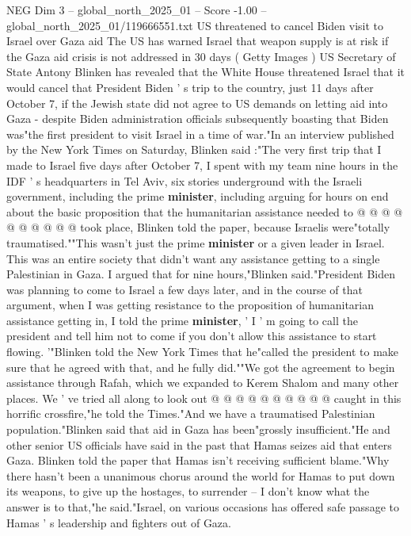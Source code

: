 \begin{textsample}{NEG Dim 3 – global\_north\_2025\_01 – Score -1.00 – global\_north\_2025\_01/119666551.txt}  \label{ex:f3_neg_192}
US threatened to cancel Biden visit to Israel over Gaza aid The US has warned Israel that weapon supply is at risk if the Gaza aid crisis is not addressed in 30 days ( Getty Images ) US Secretary of State Antony Blinken has revealed that the White House threatened Israel that it would cancel that President Biden ' s trip to the country, just 11 days after October 7, if the Jewish state did not agree to US demands on letting aid into Gaza - despite Biden administration officials subsequently boasting that Biden was"the first president to visit Israel in a time of war."In an interview published by the New York Times on Saturday, Blinken said :"The very first trip that I made to Israel five days after October 7, I spent with my team nine hours in the IDF ' s headquarters in Tel Aviv, six stories underground with the Israeli government, including the prime \textbf{minister}, including arguing for hours on end about the basic proposition that the humanitarian assistance needed to @ @ @ @ @ @ @ @ @ @ took place, Blinken told the paper, because Israelis were"totally traumatised.""This wasn't just the prime \textbf{minister} or a given leader in Israel.
This was an entire society that didn't want any assistance getting to a single Palestinian in Gaza.
I argued that for nine hours,"Blinken said."President Biden was planning to come to Israel a few days later, and in the course of that argument, when I was getting resistance to the proposition of humanitarian assistance getting in, I told the prime \textbf{minister}, ' I ' m going to call the president and tell him not to come if you don't allow this assistance to start flowing. '"Blinken told the New York Times that he"called the president to make sure that he agreed with that, and he fully did.""We got the agreement to begin assistance through Rafah, which we expanded to Kerem Shalom and many other places.
We ' ve tried all along to look out @ @ @ @ @ @ @ @ @ @ caught in this horrific crossfire,"he told the Times."And we have a traumatised Palestinian population."Blinken said that aid in Gaza has been"grossly insufficient."He and other senior US officials have said in the past that Hamas seizes aid that enters Gaza.
Blinken told the paper that Hamas isn't receiving sufficient blame."Why there hasn't been a unanimous chorus around the world for Hamas to put down its weapons, to give up the hostages, to surrender -- I don't know what the answer is to that,"he said."Israel, on various occasions has offered safe passage to Hamas ' s leadership and fighters out of Gaza.

\end{textsample}
